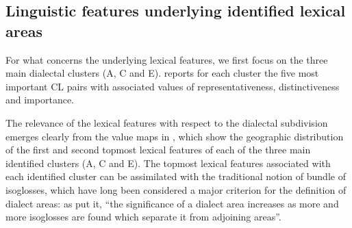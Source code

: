 \documentclass[output=paper]{LSP/langsci}
\begin{document}
\subsection{Linguistic features underlying identified lexical areas}

For what concerns the underlying lexical features, we first focus on the three main dialectal clusters (A, C and E).  reports for each cluster the five most important CL pairs with associated values of representativeness, distinctiveness and importance.

The relevance of the lexical features with respect to the dialectal subdivision emerges clearly from the value maps in , which show the geographic distribution of the first and second topmost lexical features of each of the three main identified clusters (A, C and E). The topmost lexical features associated with each identified cluster can be assimilated with the traditional notion of bundle of isoglosses, which have long been considered a major criterion for the definition of dialect areas: as \citet{chambers_dialectology_1998} put it, “the significance of a dialect area increases as more and more isoglosses are found which separate it from adjoining areas”.
\end{document}
